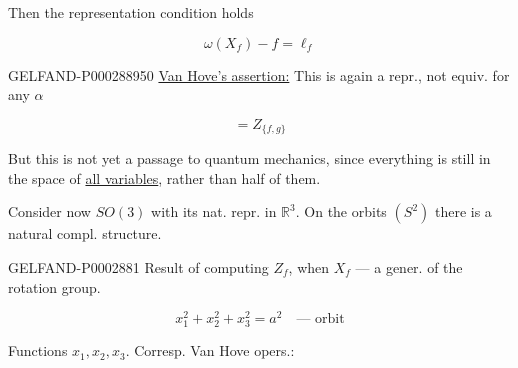 Then the representation condition holds

\begin{equation*}\omega (X_f)-f=\ell_f\end{equation*}

\begin{GelfandAdjacentEvidence}{GELFAND-P000288}{950}
\underline{Van Hove’s assertion:} This is again a repr., not equiv. for any $\alpha$

\begin{equation*}[Z_f, Z_g]=Z_{\{f, g\}}\end{equation*}\end{GelfandAdjacentEvidence}

But this is not yet a passage to quantum mechanics, since everything is still in the space of \underline{all variables}, rather than half of them.

Consider now $SO (3)$ with its nat. repr. in $\mathbb R^3$. On the orbits $(S^2)$ there is a natural compl. structure.

\begin{GelfandAdjacentEvidence}{GELFAND-P000288}{1}
Result of computing $Z_f$, when $X_f$ --- a gener. of the rotation group.





\end{GelfandAdjacentEvidence}


\begin{equation*}x_1^2+x_2^2+x_3^2=a^2\quad\text{--- orbit}\end{equation*}

Functions $x_1, x_2, x_3$. Corresp. Van Hove opers.:

\begin{center}\end{center}

